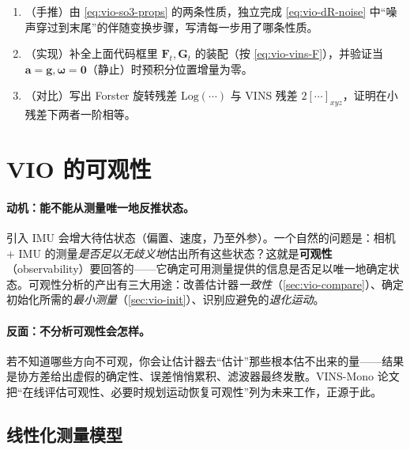 \begin{practice}
\begin{enumerate}
  \item （手推）由 \cref{eq:vio-so3-props} 的两条性质，独立完成 \cref{eq:vio-dR-noise} 中“噪声穿过到末尾”的伴随变换步骤，写清每一步用了哪条性质。
  \item （实现）补全上面代码框里 $\mathbf{F}_t,\mathbf{G}_t$ 的装配（按 \cref{eq:vio-vins-F}），并验证当 $\mathbf{a}=\mathbf{g},\boldsymbol{\omega}=\mathbf{0}$（静止）时预积分位置增量为零。
  \item （对比）写出 Forster 旋转残差 $\mathrm{Log}(\cdots)$ 与 VINS 残差 $2[\cdots]_{xyz}$，证明在小残差下两者一阶相等。
\end{enumerate}
\end{practice}

\section{VIO 的可观性}
\label{sec:vio-obs}

\paragraph{动机：能不能从测量唯一地反推状态。}
引入 IMU 会增大待估状态（偏置、速度，乃至外参）。一个自然的问题是：相机 $+$ IMU 的测量\emph{是否足以无歧义地}估出所有这些状态？这就是\textbf{可观性}（observability）要回答的——它确定可用测量提供的信息是否足以唯一地确定状态\cite{carlone2026handbook,huang2019vins}。可观性分析的产出有三大用途：改善估计器\emph{一致性}（\cref{sec:vio-compare}）、确定初始化所需的\emph{最小测量}（\cref{sec:vio-init}）、识别应避免的\emph{退化运动}。

\paragraph{反面：不分析可观性会怎样。}
若不知道哪些方向不可观，你会让估计器去“估计”那些根本估不出来的量——结果是协方差给出虚假的确定性、误差悄悄累积、滤波器最终发散。VINS-Mono 论文\cite{qin2018vins} 把“在线评估可观性、必要时规划运动恢复可观性”列为未来工作，正源于此。

\subsection{线性化测量模型}
\label{sec:vio-obs-model}

